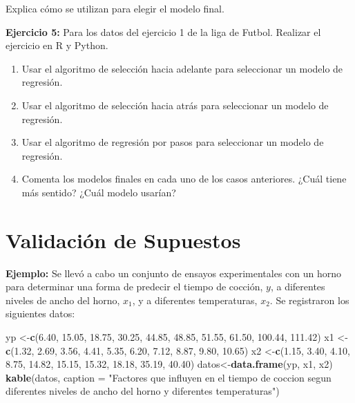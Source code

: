\documentclass[
]{book}
\newenvironment{Shaded}{\begin{snugshade}}{\end{snugshade}}
\newcommand{\AttributeTok}[1]{\textcolor[rgb]{0.13,0.29,0.53}{#1}}
\newcommand{\FloatTok}[1]{\textcolor[rgb]{0.00,0.00,0.81}{#1}}
\newcommand{\FunctionTok}[1]{\textcolor[rgb]{0.13,0.29,0.53}{\textbf{#1}}}
\newcommand{\NormalTok}[1]{#1}
\newcommand{\OtherTok}[1]{\textcolor[rgb]{0.56,0.35,0.01}{#1}}
\newcommand{\StringTok}[1]{\textcolor[rgb]{0.31,0.60,0.02}{#1}}
\begin{document}
Explica cómo se utilizan para elegir el modelo final.

\textbf{Ejercicio 5:} Para los datos del ejercicio 1 de la liga de Futbol. Realizar el ejercicio en R y Python.

\begin{enumerate}
\def\labelenumi{\alph{enumi})}
\item
  Usar el algoritmo de selección hacia adelante para seleccionar un modelo de regresión.
\item
  Usar el algoritmo de selección hacia atrás para seleccionar un modelo de regresión.
\item
  Usar el algoritmo de regresión por pasos para seleccionar un modelo de regresión.
\item
  Comenta los modelos finales en cada uno de los casos anteriores. ¿Cuál tiene más sentido? ¿Cuál modelo usarían?
\end{enumerate}

\section{Validación de Supuestos}\label{validaciuxf3n-de-supuestos}

\textbf{Ejemplo:} Se llevó a cabo un conjunto de ensayos experimentales con un horno para determinar una forma de predecir el tiempo de cocción, \(y\), a diferentes niveles de ancho del horno, \(x_1\), y a diferentes temperaturas, \(x_2\). Se registraron los siguientes datos:

\begin{Shaded}
\begin{Highlighting}[]
\NormalTok{yp }\OtherTok{\textless{}{-}}\FunctionTok{c}\NormalTok{(}\FloatTok{6.40}\NormalTok{, }\FloatTok{15.05}\NormalTok{, }\FloatTok{18.75}\NormalTok{, }\FloatTok{30.25}\NormalTok{, }\FloatTok{44.85}\NormalTok{, }\FloatTok{48.85}\NormalTok{, }\FloatTok{51.55}\NormalTok{, }\FloatTok{61.50}\NormalTok{, }\FloatTok{100.44}\NormalTok{, }\FloatTok{111.42}\NormalTok{)}
\NormalTok{x1 }\OtherTok{\textless{}{-}}\FunctionTok{c}\NormalTok{(}\FloatTok{1.32}\NormalTok{, }\FloatTok{2.69}\NormalTok{, }\FloatTok{3.56}\NormalTok{, }\FloatTok{4.41}\NormalTok{, }\FloatTok{5.35}\NormalTok{, }\FloatTok{6.20}\NormalTok{, }\FloatTok{7.12}\NormalTok{, }\FloatTok{8.87}\NormalTok{, }\FloatTok{9.80}\NormalTok{, }\FloatTok{10.65}\NormalTok{)}
\NormalTok{x2 }\OtherTok{\textless{}{-}}\FunctionTok{c}\NormalTok{(}\FloatTok{1.15}\NormalTok{, }\FloatTok{3.40}\NormalTok{, }\FloatTok{4.10}\NormalTok{, }\FloatTok{8.75}\NormalTok{, }\FloatTok{14.82}\NormalTok{, }\FloatTok{15.15}\NormalTok{, }\FloatTok{15.32}\NormalTok{, }\FloatTok{18.18}\NormalTok{, }\FloatTok{35.19}\NormalTok{, }\FloatTok{40.40}\NormalTok{)}
\NormalTok{datos}\OtherTok{\textless{}{-}}\FunctionTok{data.frame}\NormalTok{(yp, x1, x2)}
\FunctionTok{kable}\NormalTok{(datos, }\AttributeTok{caption =} \StringTok{"Factores que influyen en el tiempo de coccion segun diferentes niveles de ancho del horno y diferentes temperaturas"}\NormalTok{)}
\end{Highlighting}
\end{Shaded}
\end{document}
